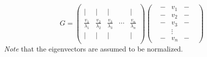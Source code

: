 \[
G = 
\begin{pmatrix}
	&  &  &  & \\
	| & | & | &  & |\\
	\frac{v_{1}}{\lambda _{1}} & \frac{v_{2}}{\lambda _{2}} & \frac{v_{3}}{\lambda _{3}} & \cdots  & \frac{v_{n}}{\lambda _{n}}\\
	| & | & | &  & |\\
	&  &  &  & 
\end{pmatrix}
\begin{pmatrix}
	& - & v_{1} & - & \\
	& - & v_{2} & - & \\
	& - & v_{3} & - & \\
	&  & \vdots  &  & \\
	& - & v_{n} & - & 
\end{pmatrix}
\]
\emph{Note} that the eigenvectors are assumed to be normalized.






























